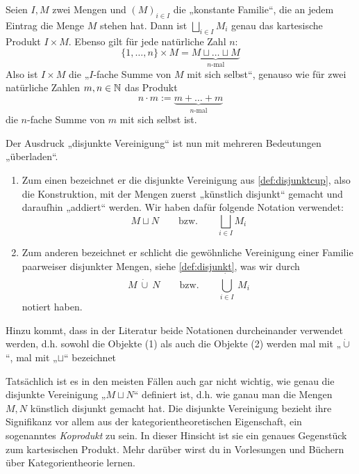     
\begin{bem}
    Seien $I,M$ zwei Mengen und $(M)_{i\in I}$ die „konstante Familie“, die an jedem Eintrag die Menge $M$ stehen hat. Dann ist $\bigsqcup_{i\in I} M_i$ genau das kartesische Produkt $I\times M$. Ebenso gilt für jede natürliche Zahl $n$:
        \[ \{1,\dots , n\} \times M = \underbrace{M\sqcup\ldots\sqcup M}_{\text{$n$-mal}} \]
    Also ist $I\times M$ die „$I$-fache Summe von $M$ mit sich selbst“, genauso wie für zwei natürliche Zahlen $m,n\in \mathbb N$ das Produkt
        \[ n\cdot m := \underbrace{m +\ldots + m}_{\text{$n$-mal}}\]
    die $n$-fache Summe von $m$ mit sich selbst ist.
\end{bem}


\begin{vorschau}
    Der Ausdruck „disjunkte Vereinigung“ ist nun mit mehreren Bedeutungen „überladen“.
    \begin{enumerate}[(1)]
        \item Zum einen bezeichnet er die disjunkte Vereinigung aus \cref{def:disjunktcup}, also die Konstruktion, mit der Mengen zuerst „künstlich disjunkt“ gemacht und daraufhin „addiert“ werden. Wir haben dafür folgende Notation verwendet:
            \[ M\sqcup N \qquad\text{bzw.}\qquad \bigsqcup_{i\in I} M_i \]
        \item Zum anderen bezeichnet er schlicht die gewöhnliche Vereinigung einer Familie paarweiser disjunkter Mengen, siehe \cref{def:disjunkt}, was wir durch
            \[ M\ \dot\cup\ N \qquad\text{bzw.}\qquad   \dot{\bigcup_{i\in I}}\ M_i \]
        notiert haben.
    \end{enumerate}
    Hinzu kommt, dass in der Literatur beide Notationen durcheinander verwendet werden, d.h. sowohl die Objekte (1) als auch die Objekte (2) werden mal mit „$\dot\cup$“, mal mit „$\sqcup$“ bezeichnet
    
    Tatsächlich ist es in den meisten Fällen auch gar nicht wichtig, wie genau die disjunkte Vereinigung „$M \sqcup N$“ definiert ist, d.h. wie ganau man die Mengen $M,N$ künstlich disjunkt gemacht hat. Die disjunkte Vereinigung bezieht ihre Signifikanz vor allem aus der kategorientheoretischen Eigenschaft, ein sogenanntes \emph{Koprodukt} zu sein. In dieser Hinsicht ist sie ein genaues Gegenstück zum kartesischen Produkt. Mehr darüber wirst du in Vorlesungen und Büchern über Kategorientheorie lernen.
\end{vorschau}





